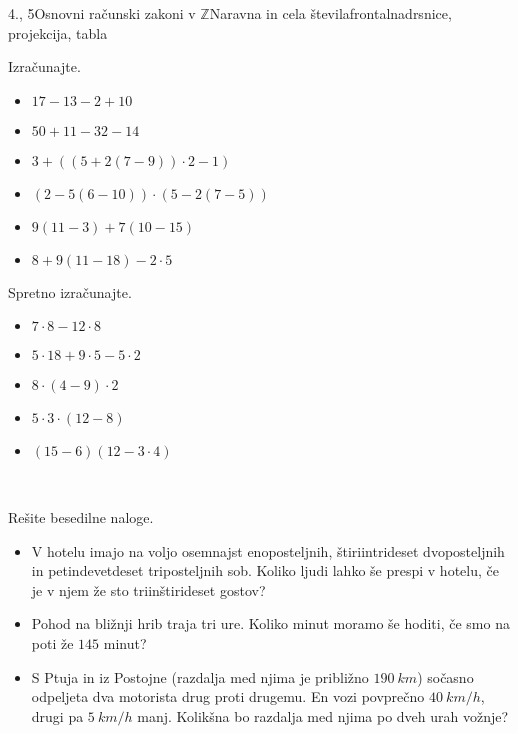 \begin{priprava}{4., 5}{}{Osnovni računski zakoni v $\mathbb{Z}$}{Naravna in cela števila}{frontalna}{drsnice, projekcija, tabla}
\begin{multicols}{2}
    \begin{naloga}
        Izračunajte.
        \begin{itemize}
            \item $17-13-2+10$  
            \item $50+11-32-14$  
            \item $3+((5+2(7-9))\cdot 2-1)$  
            \item $(2-5(6-10))\cdot(5-2(7-5))$  
            \item $9(11-3)+7(10-15)$  
            \item $8+9(11-18)-2\cdot 5$  
        \end{itemize}
    \end{naloga}

    \begin{naloga}
        Spretno izračunajte.
        \begin{itemize}
            \item $7\cdot 8-12\cdot 8$  
            \item $5\cdot 18+9\cdot 5-5\cdot 2$  
            \item $8\cdot(4-9)\cdot 2$  
            \item $5\cdot 3\cdot (12-8)$  
            \item $(15-6)(12-3\cdot 4)$  
        \end{itemize}
    \end{naloga}
    ~
\end{multicols}


    \begin{naloga}
        Rešite besedilne naloge.
        \begin{itemize}
            \item V hotelu imajo na voljo osemnajst enoposteljnih, štiriintrideset dvoposteljnih in petindevetdeset triposteljnih sob.
                Koliko ljudi lahko še prespi v hotelu, če je v njem že sto triinštirideset gostov?      
            \item Pohod na bližnji hrib traja tri ure. Koliko minut moramo še hoditi, če smo na poti že $145$ minut?       
            \item S Ptuja in iz Postojne (razdalja med njima je približno $190~km$) sočasno odpeljeta dva motorista drug proti drugemu.
                En vozi povprečno $40~km/h$, drugi pa $5~km/h$ manj. Kolikšna bo razdalja med njima po dveh urah vožnje?      
        \end{itemize}
    \end{naloga}


\end{priprava}
